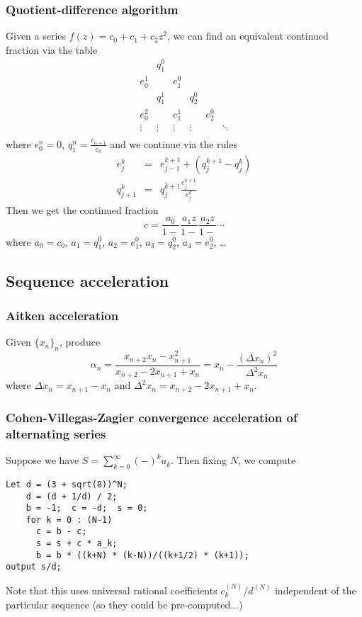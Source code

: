 \documentclass[10pt,dvipdfmx,letterpaper,twoside]{article}
\let\al=\alpha
\begin{document}
\subsubsection{Quotient-difference algorithm}
Given a series $f(z)=c_0 + c_1 + c_2 z^2$, we can find an equivalent continued fraction via the table
\[\begin{array}{cccccc}
      & q^0_1 \\
e^1_0 &       & e^0_1 \\
      & q^1_1 &       & q^0_2 \\
e^2_0 &       & e^1_1 &       & e^0_2 \\
\vdots& \vdots& \vdots& \vdots& &\ddots \\
\end{array}\]
where $e^n_0 = 0$, $q^n_1 = \frac{c_{n+1}}{c_n}$ and we continue via the rules
\begin{eqnarray*}
e^k_j &=& e^{k+1}_{j-1} + \left(q^{k+1}_j - q^k_j\right) \\
q^k_{j+1} &=& q^{k+1}_j \frac{e^{k+1}_j}{e^k_j}
\end{eqnarray*}
Then we get the continued fraction
\[ c = \frac{a_0}{1 -} \frac{a_1 z}{1 -} \frac{a_2 z}{1 -} \cdots \]
where $a_0 = c_0$, $a_1 = q^0_1$, $a_2 = e^0_1$, $a_3 = q^0_2$, $a_4 = e^0_2$, \dots

\subsection{Sequence acceleration}

\subsubsection{Aitken acceleration}
Given $\{x_n\}_n$, produce
\[ \al_n = \frac{x_{n+2}x_n - x_{n+1}^2}{x_{n+2} - 2x_{n+1} + x_n} = x_n - \frac{(\Delta x_n)^2}{\Delta^2 x_n} \]
where $\Delta x_n = x_{n+1} - x_n$ and $\Delta^2 x_n = x_{n+2} - 2x_{n+1} + x_n$.

\subsubsection{Cohen-Villegas-Zagier convergence acceleration of alternating series}
Suppose we have $S=\sum_{k=0}^\infty(-)^k a_k$.  Then fixing $N$, we compute
\begin{verbatim}
Let d = (3 + sqrt(8))^N;
    d = (d + 1/d) / 2;
    b = -1;  c = -d;  s = 0;
    for k = 0 : (N-1)
      c = b - c;
      s = s + c * a_k;
      b = b * ((k+N) * (k-N))/((k+1/2) * (k+1));
output s/d;
\end{verbatim}
Note that this uses universal rational coefficients $c^{(N)}_k/d^{(N)}$ independent of
the particular sequence (so they could be pre-computed...)
\end{document}
